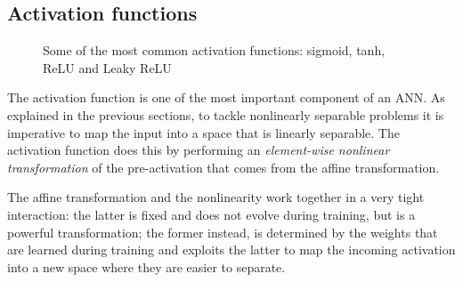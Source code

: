 \subsection{Activation functions}\label{sec:activations}
\begin{figure}[h]
    \centering
    \caption{Some of the most common activation functions: sigmoid, tanh, ReLU
        and Leaky ReLU\label{fig:activations}}
\end{figure}

\noindent The activation function is one of the most important component of an
ANN. As explained in the previous sections, to tackle nonlinearly separable
problems it is imperative to map the input into a space that is linearly
separable. The activation function does this by performing an
\emph{element-wise nonlinear transformation} of the pre-activation that comes
from the affine transformation.

The affine transformation and the nonlinearity work together in a very tight
interaction: the latter is fixed and does not evolve during training, but
is a powerful transformation; the former instead, is determined by the weights
that are learned during training and exploits the latter to map the incoming
activation into a new space where they are easier to separate.


